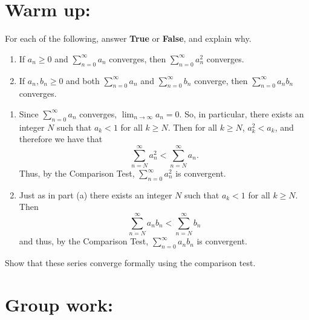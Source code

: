 \documentclass[handout]{ximera}
\begin{document}
\section{Warm up:}
For each of the following, answer {\bf True} or {\bf False}, and explain why.
	\begin{enumerate}
	
	\item  If $a_n \geq 0$ and $\sum_{n=0}^\infty a_n$ converges, then $\sum_{n=0}^\infty a_n^2$ converges.
	
	\item  If $a_n, b_n \geq 0$ and both $\sum_{n=0}^\infty a_n$ and $\sum_{n=0}^\infty b_n$ converge, then $\sum_{n=0}^\infty a_n b_n$ converges. 
	
	\end{enumerate}
	
	\begin{freeResponse}
		\begin{enumerate}
		
		\item  {}
		
		Since $\sum_{n=0}^\infty a_n$ converges, $\lim_{n \to \infty} a_n = 0$.  
		So, in particular, there exists an integer $N$ such that $a_k < 1$ for all $k \geq N$.  
		Then for all $k \geq N$, $a_k^2 < a_k$, and therefore we have that
			\[
			\sum_{n=N}^\infty a_n^2 < \sum_{n=N}^\infty a_n.
			\]
		Thus,  by the Comparison Test, $\sum_{n=0}^\infty a_n^2$ is convergent.
		
		
		
		\item  {}
		
		Just as in part (a) there exists an integer $N$ such that $a_k < 1$ for all $k \geq N$.  
		Then
			\[
			\sum_{n=N}^\infty a_n b_n < \sum_{n=N}^\infty b_n
			\]
		and thus, by the Comparison Test, $\sum_{n=0}^\infty a_n b_n$ is convergent.
		
		\end{enumerate}
	\end{freeResponse}
	
\begin{instructorNotes}
Show that these series converge formally using the comparison test.
\end{instructorNotes}







\section{Group work:}
\end{document}
